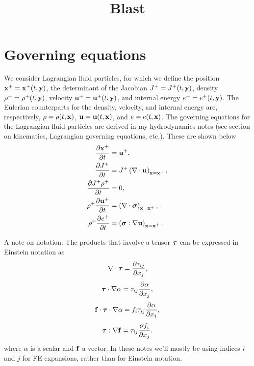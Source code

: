 \documentclass[11pt]{article}
\title{Blast}
\begin{document}
\maketitle

\section{Governing equations}
We consider Lagrangian fluid particles, for which we define the position $\mathbf{x}^+=\mathbf{x}^+(t,\mathbf{y})$, the determinant of the Jacobian $J^+ = J^+(t,\mathbf{y})$, density $\rho^+ = \rho^+(t,\mathbf{y})$, velocity $\mathbf{u}^+ = \mathbf{u}^+(t,\mathbf{y})$, and internal energy $e^+ = e^+(t,\mathbf{y})$. The Eulerian counterparts for the density, velocity, and internal energy are, respectively, $\rho = \rho(t,\mathbf{x})$, $\mathbf{u} = \mathbf{u}(t,\mathbf{x})$, and $e = e(t,\mathbf{x})$. The governing equations for the Lagrangian fluid particles are derived in my hydrodynamics notes (see section on kinematics, Lagrangian governing equations, etc.). These are shown below
\begin{align}
    \frac{\partial \mathbf{x}^+}{\partial t} &= \mathbf{u}^+, \\
    \frac{\partial J^+}{\partial t} &= J^+ \left ( \nabla \cdot \mathbf{u} \right )_{\mathbf{x} = \mathbf{x}^+}, \\
    \frac{\partial J^+ \rho^+}{\partial t} &= 0, \\
    \rho^+ \frac{\partial \mathbf{u}^+}{\partial t} &= \left ( \nabla \cdot \bm \sigma \right )_{\mathbf{x} = \mathbf{x}^+}, \\
    \rho^+ \frac{\partial e^+}{\partial t} &= \left ( \bm \sigma : \nabla \mathbf{u} \right )_{\mathbf{x} = \mathbf{x}^+}.
\end{align}

A note on notation. The products that involve a tensor $\bm \tau$ can be expressed in Einstein notation as
\begin{equation}
    \nabla \cdot \bm \tau = \frac{\partial \tau_{ij}}{\partial x_j},
\end{equation}
\begin{equation}
    \bm \tau \cdot \nabla \alpha = \tau_{ij} \frac{\partial \alpha}{\partial x_j},
\end{equation}
\begin{equation}
    \mathbf{f} \cdot \bm \tau \cdot \nabla \alpha = f_i \tau_{ij} \frac{\partial \alpha}{\partial x_j},
\end{equation}
\begin{equation}
    \bm \tau : \nabla \mathbf{f} = \tau_{ij} \frac{\partial f_i}{\partial x_j}.
\end{equation}
where $\alpha$ is a scalar and $\mathbf{f}$ a vector. In these notes we'll mostly be using indices $i$ and $j$ for FE expansions, rather than for Einstein notation.
\end{document}

